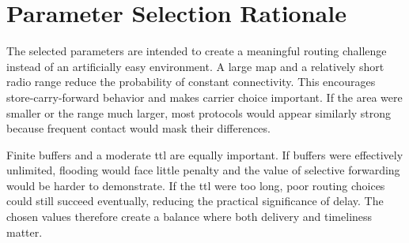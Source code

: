 \begin{table}[h!]
	\centering
	\caption{Simulation parameters}
	\renewcommand{\arraystretch}{1.3}
	\label{tab:sim_parameters}
\end{table}

\section{Parameter Selection Rationale}
The selected parameters are intended to create a meaningful routing challenge instead of an artificially easy environment. A large map and a relatively short radio range reduce the probability of constant connectivity. This encourages store-carry-forward behavior and makes carrier choice important. If the area were smaller or the range much larger, most protocols would appear similarly strong because frequent contact would mask their differences.

Finite buffers and a moderate \ac{ttl} are equally important. If buffers were effectively unlimited, flooding would face little penalty and the value of selective forwarding would be harder to demonstrate. If the \ac{ttl} were too long, poor routing choices could still succeed eventually, reducing the practical significance of delay. The chosen values therefore create a balance where both delivery and timeliness matter.


